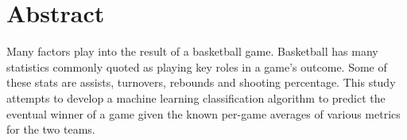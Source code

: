 \documentclass[12pt]{article}%
\begin{document}
\begin{titlepage}

\end{titlepage}

\tableofcontents

\section{Abstract}
Many factors play into the result of a basketball game. Basketball has many statistics commonly quoted as playing key roles in a game's outcome. Some of these stats are assists, turnovers, rebounds and shooting percentage. This study attempts to develop a machine learning classification algorithm to predict the eventual winner of a game given the known per-game averages of various metrics for the two teams.
\end{document}
